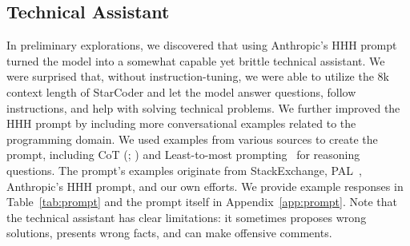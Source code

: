 \documentclass[10pt]{article} %
\begin{document}
\subsection{Technical Assistant}\label{sec:technical_assistant}

In preliminary explorations, we discovered that using Anthropic’s HHH prompt~\citep{askell2021general} turned the model into a somewhat capable yet brittle technical assistant. We were surprised that, without instruction-tuning, we were able to utilize the 8k context length of StarCoder and let the model answer questions, follow instructions, and help with solving technical problems. We further improved the HHH prompt by including more conversational examples related to the programming domain. 
We used examples from various sources to create the prompt, including CoT (\citealt{wei2022chain}; \citealt{kojima2023large}) and Least-to-most prompting~\citep{zhou2023leasttomost} for reasoning questions. The prompt's examples originate from StackExchange, PAL~\citep{gao2022pal}, Anthropic's HHH prompt, and our own efforts. We provide example responses in Table~\ref{tab:prompt} and the prompt itself in Appendix~\ref{app:prompt}. Note that the technical assistant has clear limitations: it sometimes proposes wrong solutions, presents wrong facts, and can make offensive comments.


\end{document}
